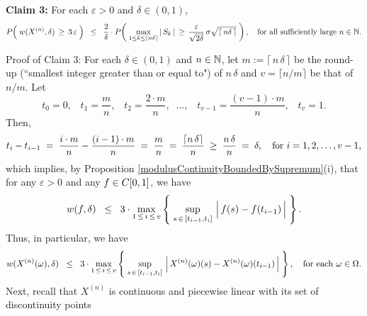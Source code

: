 \vskip 0.5cm
\begin{center}
\begin{minipage}{6.5in}
\noindent
\textbf{Claim 3:}\quad
For each $\varepsilon > 0$ and $\delta \in (0,1)$,
\begin{equation*}
P\!\left(\; w(X^{(n)},\delta) \,\overset{{\color{white}.}}{\geq}\, 3\,\varepsilon \;\right)
\;\; \leq \;\;	\dfrac{2}{\delta}\cdot
	P\!\left(\;
		\underset{1 \leq k\leq\lceil n\delta \rceil}{\max}\,\vert\,S_{k}\,\vert
		\,\overset{{\color{white}.}}{\geq}\,
		\dfrac{\varepsilon}{\sqrt{2\delta}}\,\sigma\sqrt{\lceil\,n\delta\,\rceil} 
	\;\right),
	\quad\textnormal{for all sufficiently large $n \in \N$}.
\end{equation*}
\end{minipage}
\end{center}
Proof of Claim 3:\quad
For each $\delta \in (0,1)$ and $n \in \mathbb{N}$,
let $m := \lceil\,n\,\delta\,\rceil$ be the round-up (``smallest integer greater than or equal to") of $n\,\delta$
and $v = \lceil n/m \rceil$ be that of $n / m$. Let
\begin{equation*}
t_{0} = 0,
\;\;\; t_{1} = \dfrac{m}{n},
\;\;\; t_{2} = \dfrac{2\cdot m}{n},
\;\;\ldots,
\;\;\; t_{v-1} = \dfrac{(v-1)\cdot m}{n},
\;\;\; t_{v} = 1.
\end{equation*}
Then,
\begin{equation*}
t_{i} - t_{i-1}
\;=\; \dfrac{i\cdot m}{n} - \dfrac{(i-1)\cdot m}{n}
\;=\; \dfrac{m}{n}
\;=\; \dfrac{\lceil n\,\delta \rceil}{n}
\;\geq\; \dfrac{n\,\delta}{n}
\;=\; \delta,
\quad
\textnormal{for $i = 1, 2, \ldots, v-1$,}
\end{equation*}
which implies, by Proposition \ref{modulusContinuityBoundedBySupremum}(i),
that for any $\varepsilon > 0$ and any $f \in C[0,1]$, we have
\begin{equation*}
	w(f,\delta) \;\; \leq \;\; 3 \cdot
	\max_{1\,\leq\,i\,\leq\,v}\left\{\;
	\sup_{s\,\in\,[t_{i-1},t_{i}]}\,\left\vert\,\overset{{\color{white}.}}{f}(s) - f(t_{i-1})\,\right\vert
	\;\right\}.
\end{equation*}
Thus, in particular, we have
\begin{equation*}
	w(X^{(n)}(\omega),\delta) \;\; \leq \;\; 3 \cdot
	\max_{1\,\leq\,i\,\leq\,v}\left\{\;
	\sup_{s\,\in\,[t_{i-1},t_{i}]}\,\left\vert\,X^{(n)}(\omega)(s) \overset{{\color{white}.}}{-} X^{(n)}(\omega)(t_{i-1})\,\right\vert
	\;\right\},
	\quad
	\textnormal{for each $\omega \in \Omega$.}
\end{equation*}
Next, recall that $X^{(n)}$ is continuous and piecewise linear with its set of discontinuity points
